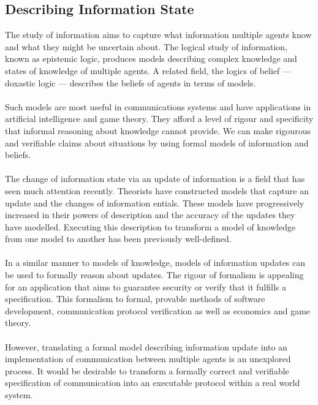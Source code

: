 \documentclass[12pt, a4paper, twoside]{article}
\begin{document}
\subsection{Describing Information State}\label{intro_infoState}
The study of information aims to capture what information multiple agents know
and what they might be uncertain about.
The logical study of information, known as epistemic logic, produces models
describing complex knowledge and states of knowledge of multiple agents.
A related field, the logics of belief --- doxastic logic --- describes the
beliefs of agents in terms of models.\\
\\
Such models are most useful in communications systems and have applications in
artificial intelligence and game theory.
They afford a level of rigour and specificity that informal reasoning about
knowledge cannot provide.
We can make rigourous and verifiable claims about situations by using
formal models of information and beliefs.\\
\\
The change of information state via an update of information is a field that has
seen much attention recently.
Theorists have constructed models that capture an update and the changes of
information entials.
These models have progressively increased in their powers of description and the
accuracy of the updates they have modelled.
Executing this description to transform a model of knowledge from one model to
another has been previously well-defined.\\
\\
In a similar manner to models of knowledge, models of information updates can be
used to formally reason about updates.
The rigour of formalism is appealing for an application that aims to guarantee
security or verify that it fulfills a specification.
This formalism to formal, provable methods of software development,
communication protocol verification as well as economics and game theory.\\
\\
However, translating a formal model describing information update into an
implementation of communication between multiple agents is an unexplored
process.
It would be desirable to transform a formally correct and verifiable specification of
communication into an executable protocol within a real world system.
\end{document}
